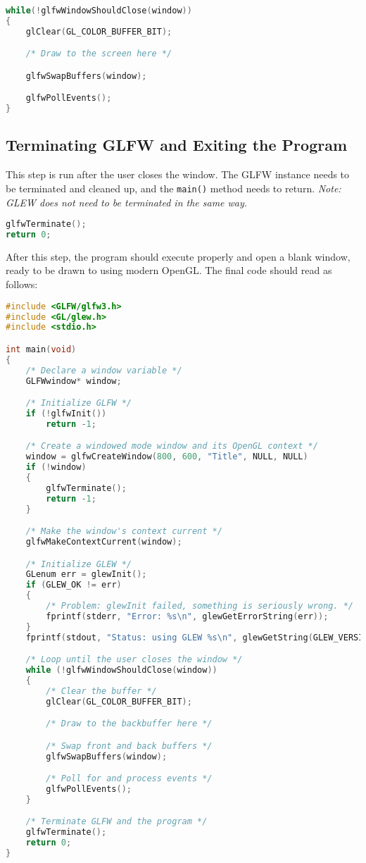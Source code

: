 \documentclass{article}
\newcommand{\ilcode}[1]{{\footnotesize\texttt{#1}}}
\begin{document}
\begin{lstlisting}[language=C++]
while(!glfwWindowShouldClose(window))
{
    glClear(GL_COLOR_BUFFER_BIT);

    /* Draw to the screen here */

    glfwSwapBuffers(window);

    glfwPollEvents();
}
\end{lstlisting}

\subsection{Terminating GLFW and Exiting the Program}

This step is run after the user closes the window. The GLFW instance needs to be terminated and cleaned up, and the \ilcode{main()} method needs to return. \textit{Note: GLEW does not need to be terminated in the same way.}

\begin{lstlisting}[language=C++]
glfwTerminate();
return 0;
\end{lstlisting}

After this step, the program should execute properly and open a blank window, ready to be drawn to using modern OpenGL. The final code should read as follows:

\break

\begin{lstlisting}[language=C++]
#include <GLFW/glfw3.h>
#include <GL/glew.h>
#include <stdio.h>

int main(void)
{
    /* Declare a window variable */
    GLFWwindow* window;

    /* Initialize GLFW */
    if (!glfwInit())
        return -1;

    /* Create a windowed mode window and its OpenGL context */
    window = glfwCreateWindow(800, 600, "Title", NULL, NULL)
    if (!window)
    {
        glfwTerminate();
        return -1;
    }

    /* Make the window's context current */
    glfwMakeContextCurrent(window);

    /* Initialize GLEW */
    GLenum err = glewInit();
    if (GLEW_OK != err)
    {
        /* Problem: glewInit failed, something is seriously wrong. */
        fprintf(stderr, "Error: %s\n", glewGetErrorString(err));
    }
    fprintf(stdout, "Status: using GLEW %s\n", glewGetString(GLEW_VERSION));

    /* Loop until the user closes the window */
    while (!glfwWindowShouldClose(window))
    {
        /* Clear the buffer */
        glClear(GL_COLOR_BUFFER_BIT);

        /* Draw to the backbuffer here */

        /* Swap front and back buffers */
        glfwSwapBuffers(window);

        /* Poll for and process events */
        glfwPollEvents();
    }

    /* Terminate GLFW and the program */
    glfwTerminate();
    return 0;
}
\end{lstlisting}
\end{document}
